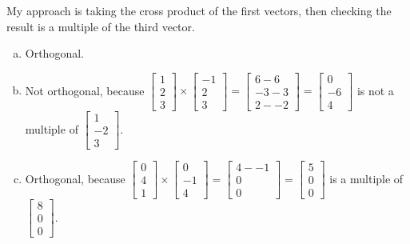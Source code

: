 \documentclass[11pt]{article}
\begin{document}
My approach is taking the cross product of the first vectors, then checking the result is a multiple of the third vector.

\begin{enumerate}[a.]
	\item %
	Orthogonal.
	
	\item %
	Not orthogonal, because $\begin{bmatrix}
	1 \\ 2 \\ 3
	\end{bmatrix}\times\begin{bmatrix}
	-1 \\ 2 \\ 3
	\end{bmatrix}=
	\begin{bmatrix}
	6-6 \\ -3-3\\ 2--2
	\end{bmatrix}=
	\begin{bmatrix}
	0 \\ -6 \\ 4
	\end{bmatrix}$ is not a multiple of $\begin{bmatrix}
	1 \\ -2 \\ 3
	\end{bmatrix}$.
	
	\item %
	Orthogonal, because $\begin{bmatrix}
	0 \\ 4 \\ 1
	\end{bmatrix}\times\begin{bmatrix}
	0 \\ -1 \\ 4
	\end{bmatrix}=
	\begin{bmatrix}
	4--1 \\ 0 \\ 0
	\end{bmatrix}=
	\begin{bmatrix}
	5 \\ 0 \\ 0
	\end{bmatrix}$ is a multiple of $\begin{bmatrix}
	8 \\ 0 \\ 0
	\end{bmatrix}$.
	

\end{enumerate}
\end{document}
